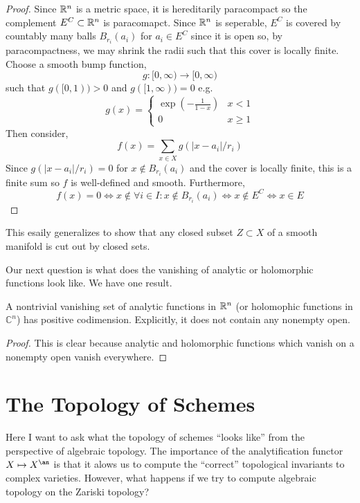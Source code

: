 \documentclass[12pt]{article}
\begin{document}
\begin{proof}
Since $\mathbb{R}^n$ is a metric space, it is hereditarily paracompact so the complement $E^C \subset \mathbb{R}^n$ is paracomapct. Since $\mathbb{R}^n$ is seperable, $E^C$ is covered by countably many balls $B_{r_i}(a_i)$ for $a_i \in E^C$ since it is open so, by paracompactness, we may shrink the radii such that this cover is locally finite. Choose a smooth bump function, 
\[ g : [0, \infty) \to [0, \infty) \]
such that $g([0, 1)) > 0$ and $g([1, \infty)) = 0$ e.g. 
\[ g(x) = 
\begin{cases}
\exp{\left( - \frac{1}{1 - x} \right)} & x < 1
\\
0 & x \ge 1
\end{cases} \]
Then consider,
\[ f(x) = \sum_{x \in X} g(|x - a_i|/r_i) \]
Since $g(|x - a_i|/r_i) = 0$ for $x \notin B_{r_i}(a_i)$ and the cover is locally finite, this is a finite sum so $f$ is well-defined and smooth. Furthermore, 
\[ f(x) = 0 \iff x \notin \forall i \in I : x \notin B_{r_i}(a_i) \iff x \notin E^C \iff x \in E \]
\end{proof}

\begin{rmk}
This esaily generalizes to show that any closed subset $Z \subset X$ of a smooth manifold is cut out by closed sets.
\end{rmk}
\noindent
Our next question is what does the vanishing of analytic or holomorphic functions look like. We have one result.

\begin{prop}
A nontrivial vanishing set of analytic functions in $\mathbb{R}^n$ (or holomophic functions in $\mathbb{C}^n$) has positive codimension. Explicitly, it does not contain any nonempty open. 
\end{prop}

\begin{proof}
This is clear because analytic and holomorphic functions which vanish on a nonempty open vanish everywhere. 
\end{proof}

\section{The Topology of Schemes}

Here I want to ask what the topology of schemes ``looks like'' from the perspective of algebraic topology. The importance of the analytification functor $X \mapsto X^\an$ is that it alows us to compute the ``correct'' topological invariants to complex varieties. However, what happens if we try to compute algebraic topology on the Zariski topology?
\end{document}
